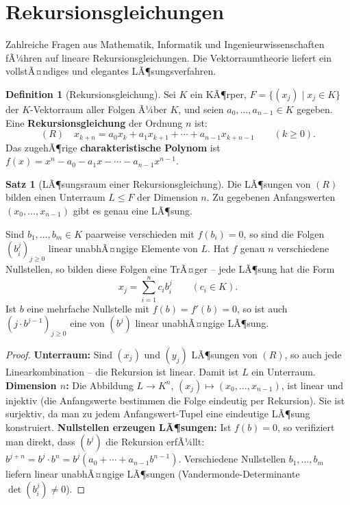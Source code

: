 ﻿\documentclass[a4paper,12pt]{report}
\theoremstyle{definition}
\newtheorem{definition}{Definition}
\newtheorem{satz}{Satz}
\begin{document}
\section{Rekursionsgleichungen}

Zahlreiche Fragen aus Mathematik, Informatik und Ingenieurwissenschaften
fÃ¼hren auf lineare Rekursionsgleichungen. Die Vektorraumtheorie liefert
ein vollstÃ¤ndiges und elegantes LÃ¶sungsverfahren.

\begin{definition}[Rekursionsgleichung]
    Sei $K$ ein KÃ¶rper, $F = \{(x_j) \mid x_j \in K\}$ der $K$-Vektorraum
    aller Folgen Ã¼ber $K$, und seien $a_0, \dots, a_{n-1} \in K$ gegeben.
    Eine \textbf{Rekursionsgleichung} der Ordnung $n$ ist:
    \[
        (R) \quad x_{k+n} = a_0 x_k + a_1 x_{k+1} + \cdots + a_{n-1} x_{k+n-1}
        \qquad (k \geq 0).
    \]
    Das zugehÃ¶rige \textbf{charakteristische Polynom} ist
    $f(x) = x^n - a_0 - a_1 x - \cdots - a_{n-1} x^{n-1}$.
\end{definition}

\begin{satz}[LÃ¶sungsraum einer Rekursionsgleichung]
    Die LÃ¶sungen von $(R)$ bilden einen Unterraum $L \leq F$ der Dimension $n$.
    Zu gegebenen Anfangswerten $(x_0, \dots, x_{n-1})$ gibt es genau eine
    LÃ¶sung.

    Sind $b_1, \dots, b_m \in K$ paarweise verschieden mit $f(b_i) = 0$,
    so sind die Folgen $(b_i^j)_{j \geq 0}$ linear unabhÃ¤ngige Elemente von $L$.
    Hat $f$ genau $n$ verschiedene Nullstellen, so bilden diese Folgen eine
    TrÃ¤ger -- jede LÃ¶sung hat die Form
    \[
        x_j = \sum_{i=1}^n c_i b_i^j \qquad (c_i \in K).
    \]
    Ist $b$ eine mehrfache Nullstelle mit $f(b) = f'(b) = 0$, so ist
    auch $(j \cdot b^{j-1})_{j \geq 0}$ eine von $(b^j)$ linear unabhÃ¤ngige
    LÃ¶sung.
\end{satz}
\begin{proof}
    \textbf{Unterraum:} Sind $(x_j)$ und $(y_j)$ LÃ¶sungen von $(R)$, so auch
    jede Linearkombination -- die Rekursion ist linear. Damit ist $L$ ein Unterraum.
    \textbf{Dimension $n$:} Die Abbildung $L \to K^n$, $(x_j) \mapsto (x_0, \ldots, x_{n-1})$,
    ist linear und injektiv (die Anfangswerte bestimmen die Folge eindeutig per Rekursion).
    Sie ist surjektiv, da man zu jedem Anfangswert-Tupel eine eindeutige LÃ¶sung konstruiert.
    \textbf{Nullstellen erzeugen LÃ¶sungen:} Ist $f(b) = 0$, so verifiziert man direkt,
    dass $(b^j)$ die Rekursion erfÃ¼llt: $b^{j+n} = b^j \cdot b^n = b^j(a_0 + \cdots
    + a_{n-1} b^{n-1})$. Verschiedene Nullstellen $b_1, \ldots, b_m$ liefern linear
    unabhÃ¤ngige LÃ¶sungen (Vandermonde-Determinante $\det(b_i^j) \neq 0$).
\end{proof}
\end{document}
